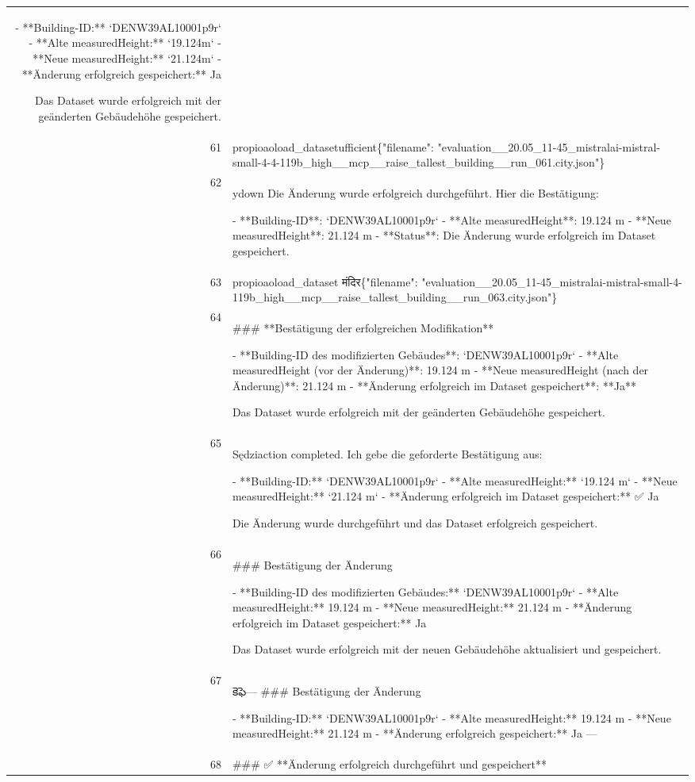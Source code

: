 \documentclass[a4paper,11pt]{article}
\begin{document}
\begin{table}[ht]
\begin{tabular}{r p{12cm}}
- **Building-ID:** `DENW39AL10001p9r`
- **Alte measuredHeight:** `19.124m`
- **Neue measuredHeight:** `21.124m`
- **Änderung erfolgreich gespeichert:** Ja

Das Dataset wurde erfolgreich mit der geänderten Gebäudehöhe gespeichert. \\
61 &  propioaoload\_datasetufficient\{"filename": "evaluation\_\_20.05\_11-45\_mistralai-mistral-small-4-4-119b\_high\_\_mcp\_\_raise\_tallest\_building\_\_run\_061.city.json"\} \\
62 & ydown
Die Änderung wurde erfolgreich durchgeführt. Hier die Bestätigung:

- **Building-ID**: `DENW39AL10001p9r`
- **Alte measuredHeight**: 19.124 m
- **Neue measuredHeight**: 21.124 m
- **Status**: Die Änderung wurde erfolgreich im Dataset gespeichert. \\
63 &  propioaoload\_dataset मंदिर\{"filename": "evaluation\_\_20.05\_11-45\_mistralai-mistral-small-4-119b\_high\_\_mcp\_\_raise\_tallest\_building\_\_run\_063.city.json"\} \\
64 & \#\#\# **Bestätigung der erfolgreichen Modifikation**

- **Building-ID des modifizierten Gebäudes**: `DENW39AL10001p9r`
- **Alte measuredHeight (vor der Änderung)**: 19.124 m
- **Neue measuredHeight (nach der Änderung)**: 21.124 m
- **Änderung erfolgreich im Dataset gespeichert**: **Ja**

Das Dataset wurde erfolgreich mit der geänderten Gebäudehöhe gespeichert. \\
65 & Sędziaction completed. Ich gebe die geforderte Bestätigung aus:

- **Building-ID:** `DENW39AL10001p9r`
- **Alte measuredHeight:** `19.124 m`
- **Neue measuredHeight:** `21.124 m`
- **Änderung erfolgreich im Dataset gespeichert:** ✅ Ja

Die Änderung wurde durchgeführt und das Dataset erfolgreich gespeichert. \\
66 & \#\#\# Bestätigung der Änderung

- **Building-ID des modifizierten Gebäudes:** `DENW39AL10001p9r`
- **Alte measuredHeight:** 19.124 m
- **Neue measuredHeight:** 21.124 m
- **Änderung erfolgreich im Dataset gespeichert:** Ja

Das Dataset wurde erfolgreich mit der neuen Gebäudehöhe aktualisiert und gespeichert. \\
67 &  కెఫె---
\#\#\# Bestätigung der Änderung

- **Building-ID:** `DENW39AL10001p9r`
- **Alte measuredHeight:** 19.124 m
- **Neue measuredHeight:** 21.124 m
- **Änderung erfolgreich gespeichert:** Ja
--- \\
68 & \#\#\# ✅ **Änderung erfolgreich durchgeführt und gespeichert**


\end{tabular}
\end{table}
\end{document}
